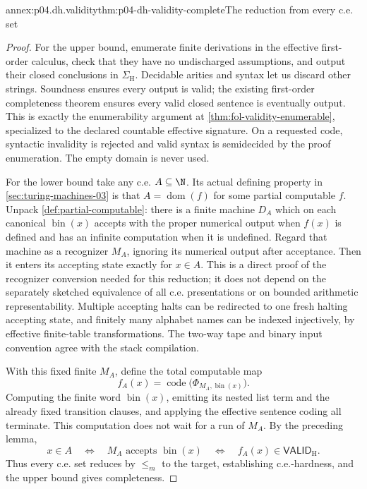 \begin{annexitem}{annex:p04.dh.validity}{thm:p04-dh-validity-complete}{The reduction from every c.e. set}
\begin{proof}
For the upper bound, enumerate finite derivations in the effective
first-order calculus, check that they have no undischarged assumptions,
and output their closed conclusions in \(\Sigma_{\mathrm H}\).
Decidable arities and syntax let us discard other strings. Soundness
ensures every output is valid; the existing first-order completeness
theorem ensures every valid closed sentence is eventually output.
This is exactly the enumerability argument at
\cref{thm:fol-validity-enumerable}, specialized to the declared countable
effective signature. On a requested code, syntactic invalidity is
rejected and valid syntax is semidecided by the proof enumeration.
The empty domain is never used.

For the lower bound take any c.e. \(A\subseteq\N\). Its actual defining
property in \cref{sec:turing-machines-03} is that \(A=\operatorname{dom}(f)\)
for some partial computable \(f\). Unpack
\cref{def:partial-computable}: there is a finite machine \(D_A\) which
on each canonical \(\operatorname{bin}(x)\) accepts with the proper
numerical output when \(f(x)\) is defined and has an infinite computation
when it is undefined. Regard that machine as a recognizer \(M_A\),
ignoring its numerical output after acceptance. Then it enters its
accepting state exactly for \(x\in A\). This is a direct proof of the
recognizer conversion needed for this reduction; it does not depend
on the separately sketched equivalence of all c.e. presentations or on
bounded arithmetic representability. Multiple accepting halts can be
redirected to one fresh halting accepting state, and finitely many
alphabet names can be indexed injectively, by effective finite-table
transformations. The two-way tape and binary input convention agree
with the stack compilation.

With this fixed finite \(M_A\), define the total computable map
\[
 f_A(x)=\operatorname{code}
        \bigl(\Phi_{M_A,\operatorname{bin}(x)}\bigr).
\]
Computing the finite word \(\operatorname{bin}(x)\), emitting its nested
list term and the already fixed transition clauses, and applying the
effective sentence coding all terminate. This computation does not
wait for a run of \(M_A\). By the preceding lemma,
\[
 x\in A
 \quad\Longleftrightarrow\quad M_A\text{ accepts }\operatorname{bin}(x)
 \quad\Longleftrightarrow\quad
 f_A(x)\in\mathsf{VALID}_{\mathrm H}.
\]
Thus every c.e. set reduces by \(\leq_m\) to the target, establishing
c.e.-hardness, and the upper bound gives completeness.


\end{proof}
\end{annexitem}
